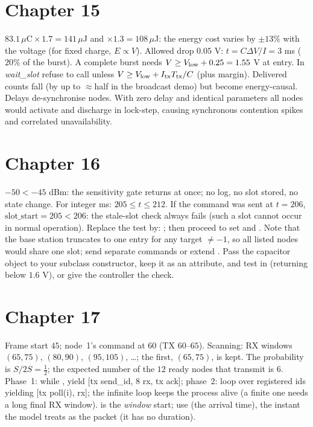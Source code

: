\section*{Chapter 15}
 $83.1\,\mu\mathrm C\times1.7=141\,\mu$J and $\times1.3=108\,\mu$J: the energy cost varies by $\pm13\%$ with the voltage (for fixed charge, $E\propto V$).
 Allowed drop $0.05$ V: $t=C\Delta V/I=3$ ms ($20\%$ of the burst). A complete burst needs $V\ge V_{\mathrm{low}}+0.25=1.55$ V at entry.
 In \emph{wait\_slot} refuse to call  unless $V\ge V_{\mathrm{low}}+I_{\mathrm{tx}}T_{\mathrm{tx}}/C$ (plus margin). Delivered counts fall (by up to $\approx$half in the broadcast demo) but become energy-causal.
 Delays de-synchronise nodes. With zero delay and identical parameters all nodes would activate and discharge in lock-step, causing synchronous contention spikes and correlated unavailability.

\section*{Chapter 16}
 $-50<-45$ dBm: the sensitivity gate returns at once; no log, no slot stored, no state change.
 For integer ms: $205\le t\le212$. If the command was sent at $t=206$, $\text{slot\_start}=205<206$: the stale-slot check always fails (such a slot cannot occur in normal operation).
 Replace the test by: ; then proceed to set  and . Note that the base station truncates  to one entry for any target $\ne-1$, so all listed nodes would share one slot; send separate commands or extend .
 Pass the capacitor object to your subclass constructor, keep it as an attribute, and test  in  (returning  below $1.6$ V), or give the controller the check.

\section*{Chapter 17}
 Frame start $45$; node~1's command at $60$ (TX $60$--$65$). Scanning: RX windows $(65,75)$, $(80,90)$, $(95,105)$, \ldots; the first, $(65,75)$, is kept.
 The probability is $S/2S=\tfrac12$; the expected number of the $12$ ready nodes that transmit is $6$.
 Phase~1: while , yield [tx send\_id, $8$ rx, tx ack]; phase~2: loop over registered ids yielding [tx poll(i), rx]; the infinite loop keeps the process alive (a finite one needs a long final RX window).
  is the \emph{window} start; use  (the arrival time), the instant the model treats as the packet (it has no duration).

